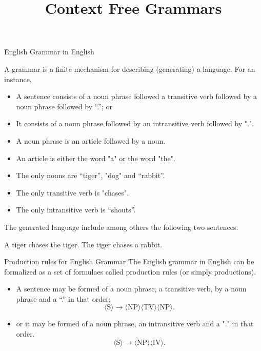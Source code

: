 \documentclass{beamer}
\title{\huge\bf Context Free Grammars}
\date{}
\newcommand{\nt}[1]{{\langle \mbox{#1}\rangle}}
\def\pspace{\vspace{\fill}}
\begin{document}
\maketitle


\begin{frame}{English Grammar in English}

A grammar is a finite mechanism for describing (generating) a language.
For an instance,
\begin{itemize}
\item A sentence consists of a noun phrase followed a transitive verb followed by a noun phrase followed by ``.''; or
\item It consists of a noun phrase followed by an intransitive verb followed by ".".
\item A noun phrase is an article followed by a noun.
\item An article is either the word "a" or the word "the".
\item The only nouns are  ``tiger'', "dog" and ``rabbit''.
\item The only transitive verb is "chases".
\item The only intransitive verb is  ``shouts''.
\end{itemize}

The generated language include among others the following two sentences.

\hfill A tiger chases  the tiger. \hfill  The tiger chases a rabbit.

\end{frame}



\begin{frame}{Production rules for English Grammar}
The English grammar in English can be formalized as a set of formulaes called production rules (or simply productions).

\pspace

\begin{itemize}
\item A sentence may be formed of   a noun phrase,  a transitive verb,  by a noun phrase and a ``.'' in that order; \pause
     \[ \nt{S} \rightarrow  \nt{NP} \nt{TV} \nt{NP} .\] \pause
\item or it may be formed of  a noun phrase, an intransitive verb and a "." in that order. \pause
     \[  \nt{S} \rightarrow   \nt{NP} \nt{IV} . \]
\end{itemize}

\pspace

\end{frame}
\end{document}
